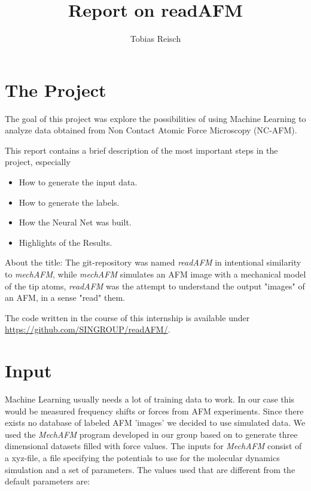 \documentclass{article}
\begin{document}
\author{Tobias Reisch}
\title{Report on readAFM}
\maketitle

\section{The Project}

The goal of this project was explore the possibilities of using Machine Learning to analyze data obtained from Non Contact Atomic Force Microscopy (NC-AFM).

This report contains a brief description of the most important steps in the project, especially
\begin{itemize}
\item How to generate the input data.
\item How to generate the labels.
\item How the Neural Net was built.
\item Highlights of the Results.
\end{itemize}

About the title: The git-repository was named \emph{readAFM} in intentional similarity to \emph{mechAFM}, while \emph{mechAFM} simulates an AFM image with a mechanical model of the tip atoms, \emph{readAFM} was the attempt to understand the output "images" of an AFM, in a sense "read" them.

The code written in the course of this internship is available under \\ \href{https://github.com/SINGROUP/readAFM/}{https://github.com/SINGROUP/readAFM/}.


\newpage
\section{Input}

Machine Learning usually needs a lot of training data to work. In our case this would be measured frequency shifts or forces from AFM experiments. Since there exists no database of labeled AFM 'images' we decided to use simulated data. We used the \emph{MechAFM} program developed in our group based on \cite{hapala2014, hamalainen2014} to generate three dimensional datasets filled with force values. The inputs for \emph{MechAFM} consist of a xyz-file, a file specifying the potentials to use for the molecular dynamics simulation and a set of parameters. The values used that are different from the default parameters are:
\end{document}
